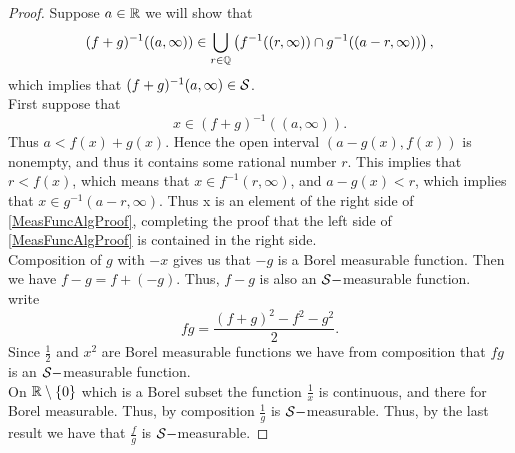 \documentclass[twoside, openright, fontsize=10pt, headings=big]{scrbook}
\begin{document}
\begin{proof}
    Suppose $a\in\mathbb{R}$ we will show that 
    \begin{equation}\label{MeasFuncAlgProof}
        (f+g)^{-1}((a,\infty))\in\bigcup_{r\in\mathbb{Q}}\left(f^{-1}((r,\infty))\cap g^{-1}((a-r,\infty))\right),
    \end{equation}
    which implies that $( f + g)^{-1}(a, \infty)\in\mathcal{S}$.\\
    First suppose that 
    \[
        x\in (f+g)^{-1}((a,\infty)).
    \]
    Thus $a < f (x) + g(x)$. Hence the open interval $(a - g(x), f (x))$ is nonempty, and thus it contains some rational number $r$. This implies that $r < f (x)$, which means that $x \in f^{-1}(r, \infty)$, and $a - g(x) < r$, which implies that $x \in g^{-1}(a -r, \infty)$. Thus x is an element of the right side of \ref{MeasFuncAlgProof}, completing the proof that the left side of \ref{MeasFuncAlgProof} is contained in the right side.\\
    Composition of $g$ with $-x$ gives us that $-g$ is a Borel measurable function. Then we have $f-g=f+(-g)$. Thus, $f-g$ is also an $\mathcal{S}-$measurable function.\\
    write
    \[
        fg=\frac{(f+g)^2-f^2-g^2}{2}.
    \]
    Since $\frac{1}{2}$ and $x^2$ are Borel measurable functions we have from composition that $fg$ is an $\mathcal{S}-$measurable function.\\
    On $\mathbb{R}\setminus\{0\}$ which is a Borel subset the function $\frac{1}{x}$ is continuous, and there for Borel measurable. Thus, by composition $\frac{1}{g}$ is $\mathcal{S}-$measurable. Thus, by the last result we have that $\frac{f}{g}$ is $\mathcal{S}-$measurable.
\end{proof}
\end{document}
